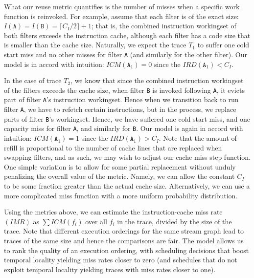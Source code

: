 What our reuse metric quantifies is the number of misses when a specific work
function is reinvoked. For example, assume that each filter is of the exact
size: $I(\texttt{A}) = I(\texttt{B}) = \lceil{C_I / 2}\rceil + 1$;
that is, the combined instruction workingset of both filters exceeds
the instruction cache, although each filter has a code size that is
smaller than the cache size. Naturally, we expect the trace $T_1$ to
suffer one cold start miss and no other misses for filter \texttt{A}
(and similarly for the other filter). Our model is in accord with
intuition:  $ICM(\texttt{A}_1) = 0$ since
the $IRD(\texttt{A}_1) < C_I$.

In the case of trace $T_2$, we know that since the combined
instruction workingset of the filters exceeds the cache size, when
filter \texttt{B} is invoked following \texttt{A}, it evicts part of
filter \texttt{A}'s instruction workingset. Hence when we transition
back to run filter \texttt{A}, we have to refetch certain
instructions, but in the process, we replace parts of filter
\texttt{B}'s workingset. Hence, we have suffered one cold start miss,
and one capacity miss for filter \texttt{A}, and similarly for
\texttt{B}. Our model is again in accord with intuition: 
$ICM(\texttt{A}_1) = 1$ since
the $IRD(\texttt{A}_1) > C_I$. Note that the
amount of refill is proportional to the number of cache lines that are
replaced when swapping filters, and as such, we may wish to adjust
our cache miss step function. One simple variation is to allow for
some partial replacement without unduly penalizing the overall value
of the metric. Namely, we can allow the constant $C_I$ to be some
fraction greater than the actual cache size. Alternatively, we can use
a more complicated miss function with a more uniform probability
distribution.

Using the metrics above, we can estimate the instruction-cache miss
rate $(IMR)$ as $\sum ICM(f_i)$ over all $f_i$ in the trace, divided
by the size of the trace. Note that different execution orderings for
the same stream graph lead to traces of the same size and hence the
comparisons are fair. The model allows us to rank the quality of an
execution ordering, with scheduling decisions that boost temporal
locality yielding miss rates closer to zero (and schedules that do not
exploit temporal locality yielding traces with miss rates closer to
one).

